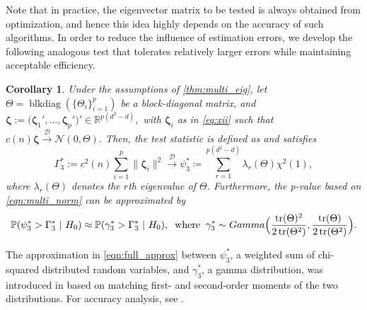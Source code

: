 \documentclass[12pt]{article}
\numberwithin{thm}{section}
\numberwithin{defn}{section}
\numberwithin{lem}{section}
\numberwithin{prop}{section}
\newtheorem{cor}{Corollary}
\numberwithin{cor}{section}
\numberwithin{rem}{section}
\DeclareMathOperator{\tr}{tr}
\DeclareMathOperator{\blkdiag}{blkdiag}
\begin{document}
Note that in practice, the eigenvector matrix to be tested is always obtained from optimization, and hence this idea highly depends on the accuracy of such algorithms.
In order to reduce the influence of estimation errors, we develop the following analogous test that tolerates relatively larger errors while maintaining acceptable efficiency.
\begin{cor}\label{cor:multi}
Under the assumptions of \autoref{thm:multi_eig}, let $\Theta = \blkdiag(\{\Theta_i\}_{i = 1}^p)$ be a block-diagonal matrix, and
$
\bm{\zeta} := \big(\bm{\zeta}_1', \dots, \bm{\zeta}_p' \big)' \in \mathbb{R}^{p(d^2-d)},
$ with $\bm{\zeta}_{i}$ as in \eqref{eq:xii} such that $c(n) \bm{\zeta} \xrightarrow{\mathcal{D}} \mathcal{N}(0, \Theta)$. Then, the test statistic is defined as and satisfies
\begin{equation}\label{eqn:multi_norm}
    \Gamma_3^* := c^2(n) \sum_{i=1}^p \|\bm{\zeta}_i\|^2
    \xrightarrow{\mathcal{D}} \psi_3^* \coloneqq
    \sum_{r=1}^{p(d^2-d)} \lambda_{r}(\Theta) \chi^2(1),
\end{equation}
where $\lambda_{r}(\Theta)$ denotes the $r$th eigenvalue of $\Theta$. Furthermore, the p-value based on \eqref{eqn:multi_norm} can be approximated by
\begin{equation}\label{eqn:full_approx}
    \mathbb{P}(\psi_3^* > \Gamma_3^* ~|~ H_0) \approx \mathbb{P}(\gamma_3^* > \Gamma_3^* ~|~ H_0), \hspace{0.2cm} \mbox{where} \hspace{0.2cm} \gamma_3^* \sim Gamma\Big(\frac{\tr(\Theta)^2}{2 \tr(\Theta^2)}, \frac{\tr(\Theta)}{2 \tr(\Theta^2)}\Big).
\end{equation}
\end{cor}
The approximation in \eqref{eqn:full_approx} between $\psi_3^*$, a weighted sum of chi-squared distributed random variables, and $\gamma_3^*$, a gamma distribution, was introduced in \citet[Theorem 3.1]{box1954} based on matching first- and second-order moments of the two distributions. For accuracy analysis, see \cite{bodenham2016comparison}.
\end{document}
